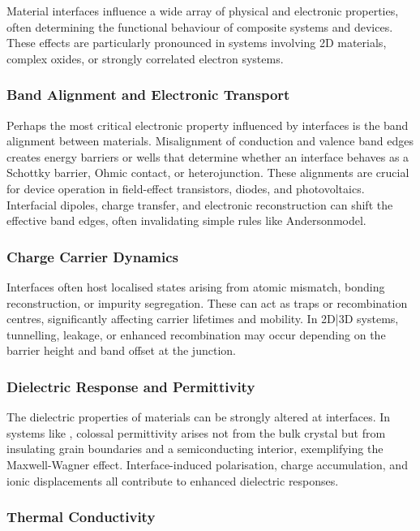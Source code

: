 Material interfaces influence a wide array of physical and electronic properties, often determining the functional behaviour of composite systems and devices. These effects are particularly pronounced in systems involving 2D materials, complex oxides, or strongly correlated electron systems.

\subsubsection{Band Alignment and Electronic Transport}

Perhaps the most critical electronic property influenced by interfaces is the band alignment between materials. Misalignment of conduction and valence band edges creates energy barriers or wells that determine whether an interface behaves as a Schottky barrier, Ohmic contact, or heterojunction. These alignments are crucial for device operation in field-effect transistors, diodes, and photovoltaics. Interfacial dipoles, charge transfer, and electronic reconstruction can shift the effective band edges, often invalidating simple rules like Anderson\rqs model.

\subsubsection{Charge Carrier Dynamics}

Interfaces often host localised states arising from atomic mismatch, bonding reconstruction, or impurity segregation. These can act as traps or recombination centres, significantly affecting carrier lifetimes and mobility. In 2D|3D systems, tunnelling, leakage, or enhanced recombination may occur depending on the barrier height and band offset at the junction.

\subsubsection{Dielectric Response and Permittivity}

The dielectric properties of materials can be strongly altered at interfaces. In systems like , colossal permittivity arises not from the bulk crystal but from insulating grain boundaries and a semiconducting interior, exemplifying the Maxwell-Wagner effect. Interface-induced polarisation, charge accumulation, and ionic displacements all contribute to enhanced dielectric responses.

\subsubsection{Thermal Conductivity}

